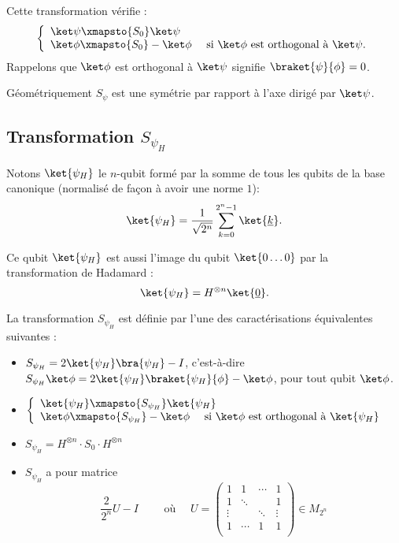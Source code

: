 \documentclass[11pt,class=report,crop=false]{standalone}
\begin{document}
Cette transformation vérifie :
$$\left\{
\begin{array}{l}
\ket\psi \xmapsto{S_0} \ket\psi \\
\ket\phi \xmapsto{S_0} -\ket\phi \quad \text{ si $\ket\phi$ est orthogonal à $\ket\psi$.} \\
\end{array}
\right.$$
Rappelons que \og{}$\ket\phi$ est orthogonal à $\ket\psi$\fg{}
signifie \og{}$\braket{\psi}{\phi}=0$\fg{}.

Géométriquement $S_\psi$ est une symétrie par rapport à l'axe dirigé par $\ket\psi$.


\subsection{Transformation $S_{\psi_H}$}

Notons $\ket{\psi_H}$ le $n$-qubit formé par la somme de tous les qubits de la base canonique (normalisé de façon à avoir une norme $1$):
$$\ket{\psi_H} = \frac{1}{\sqrt{2^n}} \sum_{k=0}^{2^n-1} \ket{\underline{k}}.$$

Ce qubit $\ket{\psi_H}$ est aussi l'image du qubit $\ket{0\ldots0}$ par la transformation de Hadamard :
$$\ket{\psi_H} =  H^{\otimes n} \ket{\underline{0}}.$$



\begin{proposition}
\label{prop:psiH}
La transformation $S_{\psi_H}$ est définie par l'une des caractérisations équivalentes suivantes :
\begin{itemize}
  \item $S_{\psi_H} = 2 \ket{\psi_H} \bra{\psi_H} - I$,
c'est-à-dire $S_{\psi_H} \ket\phi = 2 \ket{\psi_H} \braket{\psi_H}{\phi} - \ket\phi$, pour tout qubit $\ket\phi$.

  \item $\left\{
\begin{array}{l}
\ket{\psi_H} \xmapsto{S_{\psi_H}} \ket{\psi_H} \\
\ket\phi \xmapsto{S_{\psi_H}} -\ket\phi \quad \text{ si $\ket\phi$ est orthogonal à $\ket{\psi_H}$} \\
\end{array}
\right.$

  \item $S_{\psi_H} = H^{\otimes n} \cdot S_0 \cdot H^{\otimes n}$

  \item $S_{\psi_H}$ a pour matrice 
$$\frac{2}{2^n} U - I \qquad \text{ où } \quad
U = 
\begin{pmatrix}
1&1&\cdots&1\\
1&\ddots &&1\\
\vdots&&\ddots &\vdots\\
1&\cdots&1&1\\
\end{pmatrix}
\in M_{2^n}$$
\end{itemize}
\end{proposition}
\end{document}
